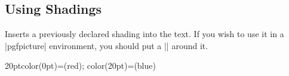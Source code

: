 \subsection{Using Shadings}
\label{section-shading-a-path}

\begin{command}{\pgfuseshading{}}
    Inserts a previously declared shading into the text. If you wish to use it
    in a |pgfpicture| environment, you should put a |\pgftext| around it.
\begin{codeexample}[]
\begin{pgfpicture}
    {20pt}{color(0pt)=(red); color(20pt)=(blue)}
\end{pgfpicture}
\end{codeexample}
\end{command}

